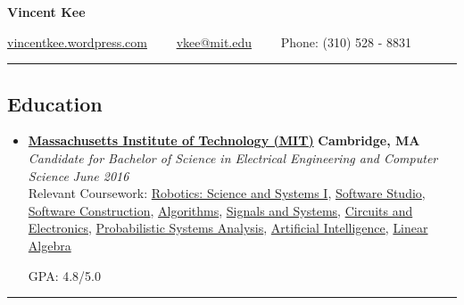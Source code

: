 \documentclass[10pt,letterpaper]{article}
\begin{document}
\begin{center}
{\huge \textbf{Vincent Kee}}

\href{http://vincentkee.wordpress.com}{vincentkee.wordpress.com}\ \ \textbullet
\ \ \href{mailto:vkee@mit.edu}{vkee@mit.edu}\ \ \textbullet
\ \  Phone: (310) 528 - 8831
\end{center}

\hrule
\vspace{-0.6em}

\subsection*{Education}
  \begin{itemize}
    \parskip=-0.1em

    \item[]
    {\href{http://mit.edu/}{\textbf{Massachusetts Institute of Technology (MIT)}} \hfill
      \textbf{Cambridge, MA}}
    \\
    {\emph{Candidate for Bachelor of Science in Electrical Engineering and Computer Science} \hfill
      \emph{June 2016}}\\
      Relevant Coursework: \href{http://student.mit.edu/catalog/search.cgi?search=6.141&style=verbatim}{Robotics: Science and Systems I}, \href{http://student.mit.edu/catalog/search.cgi?search=6.170&style=verbatim}{Software Studio}, \href{http://student.mit.edu/catalog/search.cgi?search=6.005&style=verbatim}{Software Construction}, \href{http://student.mit.edu/catalog/search.cgi?search=6.006&style=verbatim}{Algorithms}, \href{http://student.mit.edu/catalog/search.cgi?search=6.003&style=verbatim}{Signals and Systems}, \href{http://student.mit.edu/catalog/search.cgi?search=6.002&style=verbatim}{Circuits and Electronics}, \href{http://student.mit.edu/catalog/search.cgi?search=6.041&style=verbatim}{Probabilistic Systems Analysis}, \href{http://student.mit.edu/catalog/search.cgi?search=6.034&style=verbatim}{Artificial Intelligence}, \href{http://student.mit.edu/catalog/search.cgi?search=18.06&style=verbatim}{Linear Algebra}

GPA: 4.8/5.0

  \end{itemize}

\hrule
\vspace{-0.6em}

\end{document}
